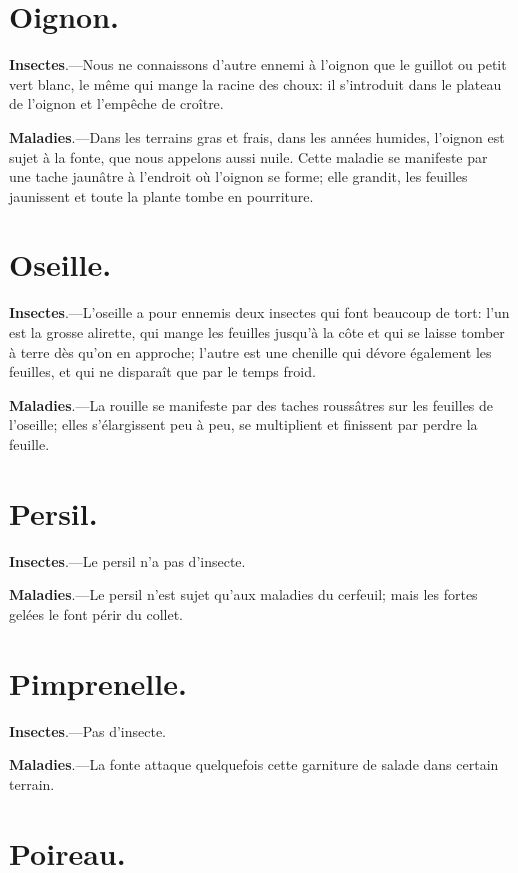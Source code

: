 \documentclass[10pt,a4paper]{book}
\begin{document}
\section{Oignon.}

\textbf{Insectes}.---Nous ne connaissons d'autre ennemi à l'oignon que le guillot ou petit vert blanc, le même qui mange la racine des choux: il s'introduit dans le plateau de l'oignon et l'empêche de croître.

\textbf{Maladies}.---Dans les terrains gras et frais, dans les années humides, l'oignon est sujet à la fonte, que nous appelons aussi nuile. Cette maladie se manifeste par une tache jaunâtre à l'endroit où l'oignon se forme; elle grandit, les feuilles jaunissent et toute la plante tombe en pourriture.

\section{Oseille.}

\textbf{Insectes}.---L'oseille a pour ennemis deux insectes qui font beaucoup de tort: l'un est la grosse alirette, qui mange les feuilles jusqu'à la côte et qui se laisse tomber à terre dès qu'on en approche; l'autre est une chenille qui dévore également les feuilles, et qui ne disparaît que par le temps froid.

\textbf{Maladies}.---La rouille se manifeste par des taches roussâtres sur les feuilles de l'oseille; elles s'élargissent peu à peu, se multiplient et finissent par perdre la feuille.

\section{Persil.}

\textbf{Insectes}.---Le persil n'a pas d'insecte.

\textbf{Maladies}.---Le persil n'est sujet qu'aux maladies du cerfeuil; mais les fortes gelées le font périr du collet.

\section{Pimprenelle.}

\textbf{Insectes}.---Pas d'insecte.

\textbf{Maladies}.---La fonte attaque quelquefois cette garniture de salade dans certain terrain.

\section{Poireau.}
\end{document}
